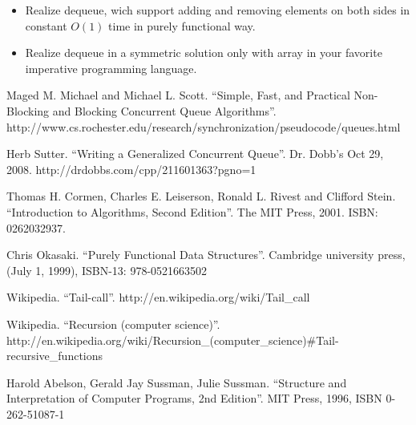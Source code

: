 \documentclass{article}
\begin{document}
\begin{Exercise}
\begin{itemize}
\item Realize dequeue, wich support adding and removing elements on both sides in
constant $O(1)$ time in purely functional way.
\item Realize dequeue in a symmetric solution only with array in your
favorite imperative programming language.
\end{itemize}
\end{Exercise}


\begin{thebibliography}{99}

Maged M. Michael and Michael L. Scott. ``Simple, Fast, and Practical Non-Blocking and Blocking Concurrent Queue Algorithms''. http://www.cs.rochester.edu/research/synchronization/pseudocode/queues.html

Herb Sutter. ``Writing a Generalized Concurrent Queue''. Dr. Dobb's Oct 29, 2008. http://drdobbs.com/cpp/211601363?pgno=1

Thomas H. Cormen, Charles E. Leiserson, Ronald L. Rivest and Clifford Stein. ``Introduction to Algorithms, Second Edition''. The MIT Press, 2001. ISBN: 0262032937.

Chris Okasaki. ``Purely Functional Data Structures''. Cambridge university press, (July 1, 1999), ISBN-13: 978-0521663502

Wikipedia. ``Tail-call''. http://en.wikipedia.org/wiki/Tail\_call

Wikipedia. ``Recursion (computer science)''. http://en.wikipedia.org/wiki/Recursion\_(computer\_science)\#Tail-recursive\_functions

Harold Abelson, Gerald Jay Sussman, Julie Sussman. ``Structure and Interpretation of Computer Programs, 2nd Edition''. MIT Press, 1996, ISBN 0-262-51087-1

\end{thebibliography}

\ifx\wholebook\relax \else
\end{document}
